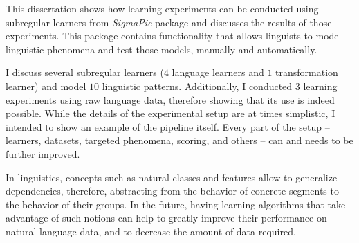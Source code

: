 This dissertation shows how learning experiments can be conducted using subregular learners from \emph{SigmaPie} package and discusses the results of those experiments.
This package contains functionality that allows linguists to model linguistic phenomena and test those models, manually and automatically.
	
I discuss several subregular learners ($4$ language learners and $1$ transformation learner) and model $10$ linguistic patterns.
Additionally, I conducted $3$ learning experiments using raw language data, therefore showing that its use is indeed possible.
While the details of the experimental setup are at times simplistic, I intended to show an example of the pipeline itself.
Every part of the setup -- learners, datasets, targeted phenomena, scoring, and others -- can and needs to be further improved.


In linguistics, concepts such as natural classes and features allow to generalize dependencies, therefore, abstracting from the behavior of concrete segments to the behavior of their groups.
In the future, having learning algorithms that take advantage of such notions can help to greatly improve their performance on natural language data, and to decrease the amount of data required.